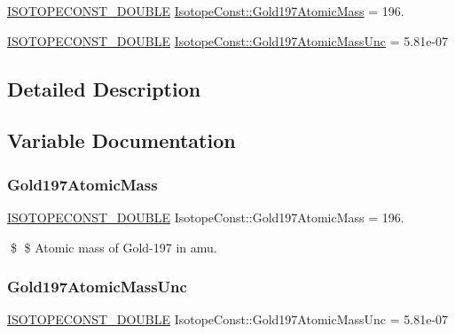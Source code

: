 \begin{DoxyCompactItemize}
\item 
\mbox{\hyperlink{group___isotope_const-_macros_ga8f45a7272ce02c0b4c65c44636ed719a}{I\+S\+O\+T\+O\+P\+E\+C\+O\+N\+S\+T\+\_\+\+D\+O\+U\+B\+LE}} \mbox{\hyperlink{group___isotope_const-_gold-_au197_gaf0557e77196736a334fdc87c83989e05}{Isotope\+Const\+::\+Gold197\+Atomic\+Mass}} = 196.
\item 
\mbox{\hyperlink{group___isotope_const-_macros_ga8f45a7272ce02c0b4c65c44636ed719a}{I\+S\+O\+T\+O\+P\+E\+C\+O\+N\+S\+T\+\_\+\+D\+O\+U\+B\+LE}} \mbox{\hyperlink{group___isotope_const-_gold-_au197_ga86e56e39b43905bcb2079f205489c970}{Isotope\+Const\+::\+Gold197\+Atomic\+Mass\+Unc}} = 5.\+81e-\/07
\end{DoxyCompactItemize}


\subsection{Detailed Description}


\subsection{Variable Documentation}
\mbox{\label{group___isotope_const-_gold-_au197_gaf0557e77196736a334fdc87c83989e05}} 
\subsubsection{\texorpdfstring{Gold197\+Atomic\+Mass}{Gold197AtomicMass}}
{\footnotesize\ttfamily \mbox{\hyperlink{group___isotope_const-_macros_ga8f45a7272ce02c0b4c65c44636ed719a}{I\+S\+O\+T\+O\+P\+E\+C\+O\+N\+S\+T\+\_\+\+D\+O\+U\+B\+LE}} Isotope\+Const\+::\+Gold197\+Atomic\+Mass = 196.}

\$ \$ Atomic mass of Gold-\/197 in amu. \mbox{\label{group___isotope_const-_gold-_au197_ga86e56e39b43905bcb2079f205489c970}} 
\subsubsection{\texorpdfstring{Gold197\+Atomic\+Mass\+Unc}{Gold197AtomicMassUnc}}
{\footnotesize\ttfamily \mbox{\hyperlink{group___isotope_const-_macros_ga8f45a7272ce02c0b4c65c44636ed719a}{I\+S\+O\+T\+O\+P\+E\+C\+O\+N\+S\+T\+\_\+\+D\+O\+U\+B\+LE}} Isotope\+Const\+::\+Gold197\+Atomic\+Mass\+Unc = 5.\+81e-\/07}

